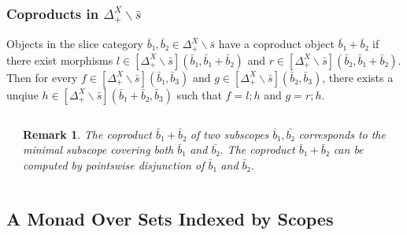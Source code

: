 \documentclass[aspectratio=169]{beamer}
\theoremstyle{remarkstyle}
\newtheorem*{remark}{Remark}
\begin{document}
\begin{frame}[fragile]
  \frametitle{Coproducts in $Δ_+^X∖\bar{s}$}
  \begin{theorem}
    Objects in the slice category $\bar{b}₁, \bar{b}₂ ∈ Δ_+^X∖\bar{s}$ have a coproduct object $\bar{b}₁ + \bar{b}₂$ if there exist morphisms $l ∈ [Δ_+^X∖\bar{s}](\bar{b}₁, \bar{b}₁ + \bar{b}₂)$ and $r ∈ [Δ_+^X∖\bar{s}](\bar{b}₂, \bar{b}₁ + \bar{b}₂)$. Then for every $f ∈ [Δ_+^X∖\bar{s}](\bar{b}₁, \bar{b}_3)$ and $g ∈ [Δ_+^X∖\bar{s}](\bar{b}₂, \bar{b}_3)$, there exists a unqiue $h ∈ [Δ_+^X∖\bar{s}](\bar{b}₁ + \bar{b}₂, \bar{b}_3)$ such that $f = l;h$ and $g = r;h$.
  \end{theorem}
  \begin{columns}
    \begin{column}{0.5\textwidth}
      \begin{example}
      \end{example}
    \end{column}
    \begin{column}{0.46\textwidth}
      \begin{remark}
        The coproduct $\bar{b}₁ + \bar{b}₂$ of two subscopes $\bar{b}₁, \bar{b₂}$ 
        corresponds to the minimal subscope covering both $\bar{b}₁$ and $\bar{b₂}$. 
        The coproduct $\bar{b}₁ + \bar{b}₂$ can be computed by pointswise disjunction of $\bar{b}₁$ and $\bar{b}₂$. 
      \end{remark}
    \end{column}
  \end{columns}
\end{frame}

\subsection{A Monad Over Sets Indexed by Scopes}
\end{document}
